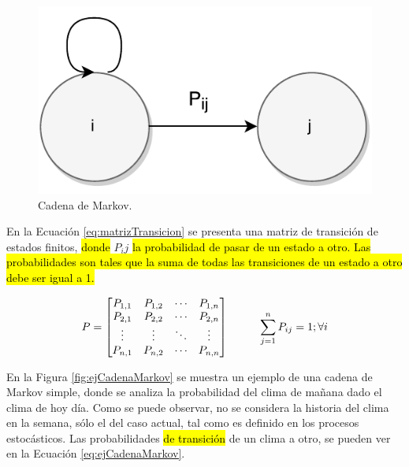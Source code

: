 \begin{figure}[ht!]
  \centering
    \includegraphics[scale=0.6]{images/CadenaMarkov.pdf}
  \caption{Cadena de Markov.}
  \label{fig:cadenaMarkov}
\end{figure}

En la Ecuación \ref{eq:matrizTransicion} se presenta una matriz de transición de estados finitos, \hl{donde} $P_ij$ \hl{la probabilidad de pasar de un estado a otro. Las probabilidades son tales que la suma de todas las transiciones de un estado a otro debe ser igual a 1.}

\begin{equation} \label{eq:matrizTransicion}
	P =
	\begin{bmatrix}
		P_{1,1} & P_{1,2} & \cdots & P_{1,n} \\
		P_{2,1} & P_{2,2} & \cdots & P_{2,n} \\
		\vdots  & \vdots  & \ddots & \vdots  \\
		P_{n,1} & P_{n,2} & \cdots & P_{n,n} \\
	\end{bmatrix}
	\hspace*{1cm} \sum_{j=1}^{n} P_{ij} = 1 ; \forall i
\end{equation}

En la Figura \ref{fig:ejCadenaMarkov} se muestra un ejemplo de una cadena de Markov simple, donde se analiza la probabilidad del clima de mañana dado el clima de hoy día. Como se puede observar, no se considera la historia del clima en la semana, sólo el del caso actual, tal como es definido en los procesos estocásticos. Las probabilidades \hl{de transición} de un clima a otro, se pueden ver en la Ecuación \ref{eq:ejCadenaMarkov}.

